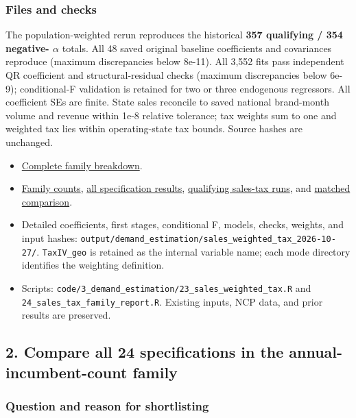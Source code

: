 \documentclass[10pt,]{article}
\providecommand{\tightlist}{%
  \setlength{\itemsep}{0pt}\setlength{\parskip}{0pt}}
\begin{document}
\subsubsection{Files and checks}\label{files-and-checks}

The population-weighted rerun reproduces the historical \textbf{357
qualifying / 354 negative- \(\alpha\) } totals. All 48 saved original
baseline coefficients and covariances reproduce (maximum discrepancies
below 8e-11). All 3,552 fits pass independent QR coefficient and
structural-residual checks (maximum discrepancies below 6e-9);
conditional-F validation is retained for two or three endogenous
regressors. All coefficient SEs are finite. State sales reconcile to
saved national brand-month volume and revenue within 1e-8 relative
tolerance; tax weights sum to one and weighted tax lies within
operating-state tax bounds. Source hashes are unchanged.

\begin{itemize}
\tightlist
\item
  \href{marc_mtg_2026-10-27_sales_tax_family_summary.md}{Complete family
  breakdown}.
\item
  \href{tables/2026-10-27_tax_weight_family_counts.csv}{Family counts},
  \href{tables/2026-10-27_tax_weight_specification_index.csv}{all
  specification results},
  \href{tables/2026-10-27_sales_tax_sigma_between_zero_and_one.csv}{qualifying
  sales-tax runs}, and
  \href{tables/2026-10-27_tax_weight_paired_comparison.csv}{matched
  comparison}.
\item
  Detailed coefficients, first stages, conditional F, models, checks,
  weights, and input hashes:
  \texttt{output/demand\_estimation/sales\_weighted\_tax\_2026-10-27/}.
  \texttt{TaxIV\_geo} is retained as the internal variable name; each
  mode directory identifies the weighting definition.
\item
  Scripts:
  \texttt{code/3\_demand\_estimation/23\_sales\_weighted\_tax.R} and
  \texttt{24\_sales\_tax\_family\_report.R}. Existing inputs, NCP data,
  and prior results are preserved.
\end{itemize}

\subsection{2. Compare all 24 specifications in the
annual-incumbent-count
family}\label{compare-all-24-specifications-in-the-annual-incumbent-count-family}

\subsubsection{Question and reason for
shortlisting}\label{question-and-reason-for-shortlisting}
\end{document}
